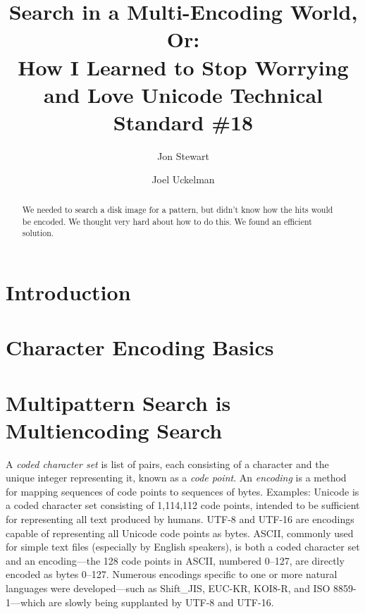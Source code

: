 \documentclass[5p,final,number,sort&compress]{elsarticle}
\begin{document}
\begin{frontmatter}

\title{Search in a Multi-Encoding World, Or:\\ How I Learned to Stop Worrying and Love Unicode Technical Standard \#18}

\author{Jon Stewart}

\author{Joel Uckelman}

\address{Lightbox Technologies, Inc. \\ Arlington, VA}

\begin{abstract}
We needed to search a disk image for a pattern, but didn't know how the hits would be encoded. We thought very hard about how to do this. We found an efficient solution.
\end{abstract}

\end{frontmatter}

\section{Introduction}

\section{Character Encoding Basics}

\section{Multipattern Search is Multiencoding Search}
\label{sec:multi}

A \emph{coded character set} is list of pairs, each consisting of a character and the unique integer representing it, known as a \emph{code point}.  An \emph{encoding} is a method for mapping sequences of code points to sequences of bytes. Examples: Unicode is a coded character set consisting of 1,114,112 code points, intended to be sufficient for representing all text produced by humans. UTF-8 and UTF-16 are encodings capable of representing all Unicode code points as bytes. ASCII, commonly used for simple text files (especially by English speakers), is both a coded character set and an encoding---the 128 code points in ASCII, numbered 0--127, are directly encoded as bytes 0--127. Numerous encodings specific to one or more natural languages were developed---such as Shift\_JIS, EUC-KR, KOI8-R, and ISO 8859-1---which are slowly being supplanted by UTF-8 and UTF-16.
\end{document}
